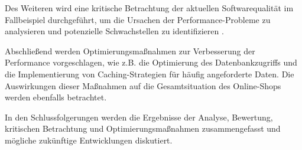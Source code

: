 Des Weiteren wird eine kritische Betrachtung der aktuellen Softwarequalität im Fallbeispiel durchgeführt, um die Ursachen der Performance-Probleme zu analysieren und potenzielle Schwachstellen zu identifizieren .

Abschließend werden Optimierungsmaßnahmen zur Verbesserung der Performance vorgeschlagen, wie z.B. die Optimierung des Datenbankzugriffs und die Implementierung von Caching-Strategien für häufig angeforderte Daten. Die Auswirkungen dieser Maßnahmen auf die Gesamtsituation des Online-Shops werden ebenfalls betrachtet.

In den Schlussfolgerungen werden die Ergebnisse der Analyse, Bewertung, kritischen Betrachtung und Optimierungsmaßnahmen zusammengefasst und mögliche zukünftige Entwicklungen diskutiert.